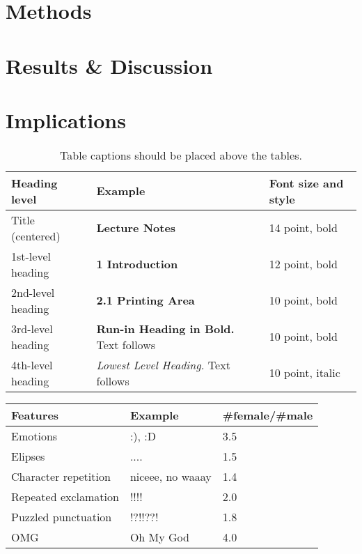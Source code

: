\documentclass[runningheads]{llncs}
\begin{document}
	
	\section{Methods}
	
	\section{Results \& Discussion}
	
	\section{Implications}
	
	\begin{table}
		\caption{Table captions should be placed above the
			tables.}\label{tab1}
		\begin{tabular}{|l|l|l|}
			\hline
			Heading level &  Example & Font size and style\\
			\hline
			Title (centered) &  {\Large\bfseries Lecture Notes} & 14 point, bold\\
			1st-level heading &  {\large\bfseries 1 Introduction} & 12 point, bold\\
			2nd-level heading & {\bfseries 2.1 Printing Area} & 10 point, bold\\
			3rd-level heading & {\bfseries Run-in Heading in Bold.} Text follows & 10 point, bold\\
			4th-level heading & {\itshape Lowest Level Heading.} Text follows & 10 point, italic\\
			\hline
		\end{tabular}
	\end{table}
	
	\begin{table}
		\begin{tabular}{|l|l|l|}
			\hline
			Features &  Example & \#female/\#male\\
			\hline
			Emotions &  :), :D & 3.5\\
			Elipses &  ....  & 1.5\\
			Character repetition & niceee, no waaay & 1.4\\
			Repeated exclamation & !!!!  &  2.0 \\
			Puzzled punctuation & !?!!??! & 1.8\\
			OMG & Oh My God & 4.0\\
			\hline
		\end{tabular}
	\end{table}


	\nocite{*}
	
	
	
\end{document}
